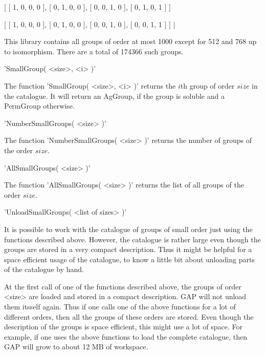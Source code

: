     [ [  1,  0,  0,  0 ],
      [  0,  1,  0,  0 ],
      [  0,  0,  1,  0 ],
      [  0,  1,  0,  1 ] ]
    
    [ [  1,  0,  0,  0 ],
      [  0,  1,  0,  0 ],
      [  0,  0,  1,  0 ],
      [  0,  0,  1,  1 ] ] |

\newpage
{}%

This library contains all groups of order at most 1000 except for
512 and 768 up to isomorphism.  There are a total of 174366 such groups.

\vspace{5mm}
'SmallGroup( <size>, <i> )'%

The function 'SmallGroup( <size>, <i> )' returns the $i$th  group of  order
$size$ in the catalogue. It will return an AgGroup, if the group is soluble
and a PermGroup otherwise.

\vspace{5mm}
'NumberSmallGroups( <size> )'%

The function 'NumberSmallGroups( <size> )' returns the  number of groups of
the order $size$.

\vspace{5mm}
'AllSmallGroups( <size> )'

The function 'AllSmallGroups( <size> )' returns the list  of all groups  of
the order $size$.

\vspace{5mm}
'UnloadSmallGroups( <list of sizes> )'

It  is possible to  work with the  catalogue of  groups of small order just
using the functions described above. However, the catalogue is rather large
even though  the groups are stored in a very compact  description.  Thus it
might be helpful  for a space efficient  usage of the catalogue,  to know a 
little bit about unloading parts of the catalogue by hand.

At the first call of one  of the  functions  described above, the groups of 
order <size> are loaded  and  stored in a compact description. GAP will not 
unload them itsself again. Thus if one calls one of the above functions for
a lot of different orders,  then all the groups of these orders are stored. 
Even though the  description of the groups  is space efficient,  this might
use a lot  of space.  For example,  if one uses the above functions to load 
the complete catalogue, then GAP will grow to about 12 MB of workspace.

